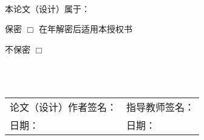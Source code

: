 \documentclass[UTF8,a4paper,12pt]{ctexart}
\numberwithin{equation}{section}
\begin{document}
~\\
\songti{}
本论文（设计）属于：\par
保\quad 密 $\Box$  \quad 在\underline{\qquad}年解密后适用本授权书\par
不保密 $\Box$

~\\
~\\
\begin{flushleft}
\songti{}
\begin{tabular}{l l}
论文（设计）作者签名：\underline{\hspace{6em}} \hspace{300mm}&指导教师签名：\underline{\hspace{6em}} \\
日期：\underline{\hspace{6em}} &日期：\underline{\hspace{6em}}\\
\end{tabular}
\end{flushleft}
\end{document}
